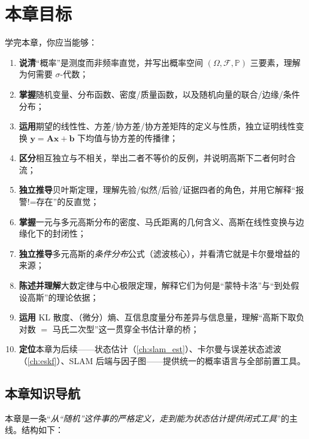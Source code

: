 \section*{本章目标}
学完本章，你应当能够：
\begin{enumerate}
  \item \textbf{说清}“概率”是测度而非频率直觉，并写出概率空间 $(\Omega,\mathcal{F},\mathbb{P})$ 三要素，理解为何需要 $\sigma$-代数；
  \item \textbf{掌握}随机变量、分布函数、密度/质量函数，以及随机向量的联合/边缘/条件分布；
  \item \textbf{运用}期望的线性性、方差/协方差/协方差矩阵的定义与性质，独立证明线性变换 $\mathbf{y}=\mathbf{A}\mathbf{x}+\mathbf{b}$ 下均值与协方差的传播律；
  \item \textbf{区分}相互独立与不相关，举出二者不等价的反例，并说明高斯下二者何时合流；
  \item \textbf{独立推导}贝叶斯定理，理解先验/似然/后验/证据四者的角色，并用它解释“报警!=存在”的反直觉；
  \item \textbf{掌握}一元与多元高斯分布的密度、马氏距离的几何含义、高斯在线性变换与边缘化下的封闭性；
  \item \textbf{独立推导}多元高斯的\emph{条件分布}公式（滤波核心），并看清它就是卡尔曼增益的来源；
  \item \textbf{陈述并理解}大数定律与中心极限定理，解释它们为何是“蒙特卡洛”与“到处假设高斯”的理论依据；
  \item \textbf{运用} KL 散度、（微分）熵、互信息度量分布差异与信息量，理解“高斯下取负对数 $=$ 马氏二次型”这一贯穿全书估计章的桥；
  \item \textbf{定位}本章为后续——状态估计（\cref{ch:slam_est}）、卡尔曼与误差状态滤波（\cref{ch:eskf}）、SLAM 后端与因子图——提供统一的概率语言与全部前置工具。
\end{enumerate}

\subsection*{本章知识导航}
本章是一条“\emph{从“随机”这件事的严格定义，走到能为状态估计提供闭式工具}”的主线。结构如下：

